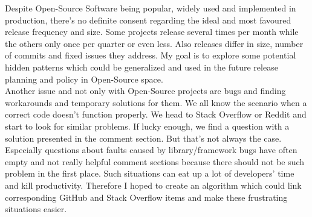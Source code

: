 Despite Open-Source Software being popular, widely used and implemented in production, there's no definite consent regarding the ideal and most favoured release frequency and size. Some projects release several times per month while the others only once per quarter or even less. Also releases differ in size, number of commits and fixed issues they address. My goal is to explore some potential hidden patterns which could be generalized and used in the future release planning and policy in Open-Source space.\\
Another issue and not only with Open-Source projects are bugs and finding workarounds and temporary solutions for them. We all know the scenario when a correct code doesn't function properly. We head to Stack Overflow or Reddit and start to look for similar problems. If lucky enough, we find a question with a solution presented in the comment section. But that's not always the case. Especially questions about faults caused by library/framework bugs have often empty and not really helpful comment sections because there should not be such problem in the first place. Such situations can eat up a lot of developers' time and kill productivity. Therefore I hoped to create an algorithm which could link corresponding GitHub and Stack Overflow items and make these frustrating situations easier.

